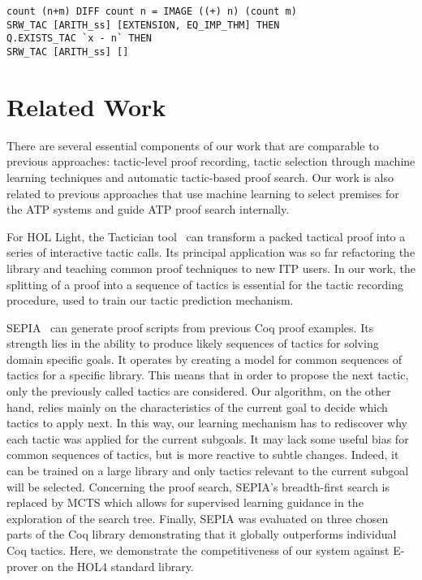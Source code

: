 \documentclass[runningheads,a4paper,draft]{svjour3}
\def\holfour{\textsf{HOL4}\xspace}
\def\hollight{\textsf{HOL Light}\xspace}
\def\coq{\textsf{Coq}\xspace}
\def\eprover{\textsf{E-prover}\xspace}
\begin{document}
\begin{example}\label{ex:cs4}
\begin{lstlisting}[language=SMLSmall]
count (n+m) DIFF count n = IMAGE ((+) n) (count m)
SRW_TAC [ARITH_ss] [EXTENSION, EQ_IMP_THM] THEN
Q.EXISTS_TAC `x - n` THEN
SRW_TAC [ARITH_ss] []
\end{lstlisting}
\end{example}


\section{Related Work}
There are several essential components of our work that are comparable to
previous approaches: tactic-level proof recording, tactic
selection through machine learning techniques and automatic tactic-based proof
search. Our work is also related to previous approaches that use machine
learning to select premises for the ATP systems and guide ATP proof search
internally.

For \hollight, the Tactician tool~\cite{DBLP:conf/sefm/Adams15}
can transform a packed tactical proof into a series of interactive tactic
calls. Its principal application
was so far refactoring the library and teaching common proof techniques to new
ITP users. In our work, the splitting of a proof into a sequence of tactics is
essential for the
tactic recording procedure, used to train our tactic prediction mechanism.

\textsf{SEPIA}~\cite{DBLP:conf/cade/GransdenWR15} can
generate
proof scripts from previous \coq proof examples.
Its strength lies in the ability to produce likely sequences
of tactics for solving domain specific goals. It operates by creating a model
for common sequences of tactics for a specific library.
This means that in order to propose the next tactic, only the previously
called tactics
are considered.
Our algorithm, on the other hand, relies mainly on the characteristics of the
current goal
to decide
which tactics to apply next. In this way, our learning mechanism has to
rediscover why each
tactic was applied for the current subgoals. It may lack some useful bias for
common sequences
of tactics, but is more reactive to subtle changes. Indeed, it can be trained
on a large library and only tactics relevant to the current subgoal will be
selected.
Concerning the proof search, \textsf{SEPIA}'s %
breadth-first search is replaced by MCTS which allows for supervised learning
guidance in the exploration of the search tree.
Finally, \textsf{SEPIA} was evaluated on three chosen parts of the
\coq library demonstrating that it globally outperforms individual \coq
tactics. Here, we demonstrate the competitiveness of our system against
\eprover on the \holfour standard library.
\end{document}
